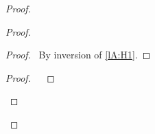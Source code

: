 \documentclass[a4paper]{article}
\begin{document}
\begin{proof}
    \begin{proof}
        \begin{proof}
            \pf\ By inversion of \ref{lA:H1}.
        \end{proof}
        \qedstep
        \begin{proof}
            \pf\ 
                        {\judge {\aContext}
                            {\aTerm[3]}
                            {\aType[1]}}
                        {}
        \end{proof}
    \end{proof}
\end{proof}
\end{document}

